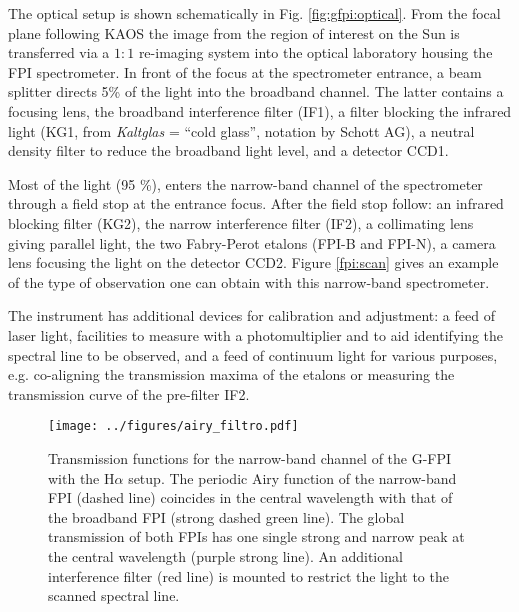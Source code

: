The optical setup is shown schematically in Fig. \ref{fig:gfpi:optical}. From the focal plane following KAOS the image from the region of interest on the Sun is transferred via a $1:1$ re-imaging system into the optical laboratory housing the FPI spectrometer. In front of the focus at the spectrometer entrance, a beam splitter directs 5\% of the light into the broadband channel. The latter contains a focusing lens, the broadband interference filter (IF1), a filter blocking the infrared light (KG1, from \emph{Kaltglas} = ``cold glass'', notation by Schott AG), a neutral density filter to reduce the broadband light level, and a detector CCD1.


Most of the light (95 \%), enters the narrow-band channel of the spectrometer through a field stop at the entrance focus. After the field stop follow: an infrared  blocking filter (KG2), the narrow interference filter (IF2), a collimating lens giving parallel light, the two Fabry-Perot etalons (FPI-B and FPI-N), a camera lens focusing the light on the detector CCD2. Figure \ref{fpi:scan} gives an example of the type of observation one can obtain with this narrow-band spectrometer.

The instrument has additional devices for calibration and adjustment: a feed of laser light, facilities to measure with a photomultiplier and to aid identifying the spectral line to be observed, and a feed of continuum light for various purposes, e.g. co-aligning the transmission maxima of the etalons or measuring the transmission curve of the pre-filter IF2.

\begin{figure}[t]
\begin{center}
\texttt{[image: ../figures/airy\_filtro.pdf]}
\caption{Transmission functions for the narrow-band channel of the G-FPI with the H$\alpha$ setup. The periodic Airy function of the narrow-band FPI (dashed line) coincides in the central wavelength with that of the broadband FPI (strong dashed green line). The global transmission of both FPIs has one single strong and narrow peak at the central wavelength (purple strong line). An additional interference filter (red line) is mounted to restrict the light to the scanned spectral line.}
\label{fig:gfpi:transimance}
\end{center}
\end{figure}



